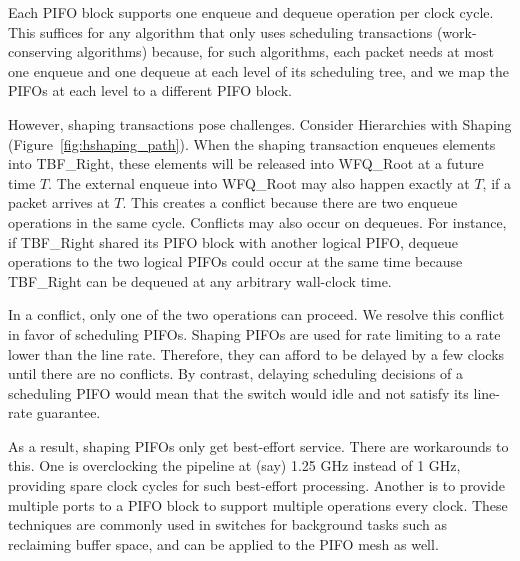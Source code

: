 Each PIFO block supports one enqueue and dequeue operation per clock cycle.
This suffices for any algorithm that only uses scheduling transactions
(work-conserving algorithms) because, for such algorithms, each packet needs at
most one enqueue and one dequeue at each level of its scheduling tree, and we
map the PIFOs at each level to a different PIFO block.

However, shaping transactions pose challenges. Consider Hierarchies with
Shaping (Figure~\ref{fig:hshaping_path}). When the shaping transaction enqueues
elements into TBF\_Right, these elements will be released into WFQ\_Root at a
future time $T$. The external enqueue into WFQ\_Root may also happen exactly at
$T$, if a packet arrives at $T$. This creates a conflict because there are two
enqueue operations in the same cycle.  Conflicts may also occur on dequeues.
For instance, if TBF\_Right shared its PIFO block with another logical PIFO,
dequeue operations to the two logical PIFOs could occur at the same time
because TBF\_Right can be dequeued at any arbitrary wall-clock time.


In a conflict, only one of the two operations can proceed. We resolve
this conflict in favor of scheduling PIFOs. Shaping PIFOs are used for
rate limiting to a rate lower than the line rate. Therefore, they
can afford to be delayed by a few clocks until there are no
conflicts. By contrast, delaying scheduling decisions of a scheduling PIFO
would mean that the switch would idle and not satisfy its line-rate guarantee.


As a result, shaping PIFOs only get best-effort
service. There are workarounds to this. One is overclocking the pipeline at
(say) 1.25 GHz instead of 1 GHz, providing spare clock cycles for such
best-effort processing. Another is to provide multiple ports to a PIFO block to
support multiple operations every clock.  These techniques are commonly used in
switches for background tasks such as reclaiming buffer
space, and can be applied to the PIFO mesh as well.
